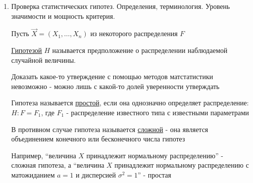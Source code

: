 \begin{enumerate}
    Пусть $\chi_1^2$ и $\chi_2^2$ - квантили $H_{n}$ уровней $\frac{1 - \gamma}{2}$ и $\frac{1 + \gamma}{2}$

    Тогда $P\left(\chi_1^2 < \frac{n \tilde{\sigma^2}}{\sigma^2} < \chi_2^2\right) = F_{H_{n}}(\chi_1^2) - F_{H_{n}}(\chi_2^2) = \frac{1 - \gamma}{2} - \frac{1 + \gamma}{2} = \gamma$

    Аналогично получаем интервал $\left(\frac{n \tilde{\sigma^2}}{\chi_2^2}, \frac{n \tilde{\sigma^2}}{\chi_1^2}\right)$, 
    где $\chi_1^2$ и $\chi_2^2$ - квантили $H_{n}$ уровней $\frac{1 - \gamma}{2}$ и $\frac{1 + \gamma}{2}$, $n \tilde{\sigma^2} = \sum_{i = 1}^n (X_i - a)^2$

    \Nota $\tilde{\sigma^2} - D^* = \frac{1}{n} \sum_{i = 1}^n (X_i - a)^2 - \frac{1}{n} \sum_{i = 1}^n (X_i - \overline{x})^2 = 
    \frac{1}{n} \sum_{i = 1}^n (X_i^2 - 2aX_i + a^2 - X_i^2 + 2 \overline{x} X_i - \overline{x}^2) = 
    \frac{1}{n} (na^2 - 2a n \overline{x} + 2 \overline{x} \cdot n \overline{x} - n \overline{x}^2) = 
    a^2 - 2a \overline{x} + \overline{x}^2 = (a - \overline{x})^2 \Longrightarrow \tilde{\sigma^2} = D^* + (a - \overline{x})^2$

    Получаем $\left(\frac{n (D^* + (a - \overline{x})^2)}{\chi_2^2}, \frac{n (D^* + (a - \overline{x})^2)}{\chi_1^2}\right)$

    \item Проверка статистических гипотез. Определения, терминология. Уровень значимости и мощность критерия.

    Пусть $\vec X = (X_1, \dots, X_n)$ из некоторого распределения $F$

    \Def \underline{\hyperlink{hypothesis}{Гипотезой}} $H$ называется предположение о распределении наблюдаемой случайной величины. 

    Доказать какое-то утверждение с помощью методов матстатистики невозможно - можно лишь с какой-то долей 
    уверенности утверждать

    \Defs Гипотеза называется \underline{простой}, если она однозначно определяет распределение: 
    $H : F = F_1$, где $F_1$ - распределение известного типа с известными параметрами

    В противном случае гипотеза называется \underline{сложной} - она является объединением конечного или бесконечного числа
    гипотез

    Например, \enquote{величина $X$ принадлежит нормальному распределению} - сложная гипотеза, а 
    \enquote{величина $X$ принадлежит нормальному распределению с матожиданием $a = 1$ и дисперсией $\sigma^2 = 1$} - простая


\end{enumerate}
